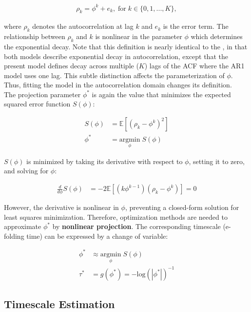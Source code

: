 \documentclass[main.tex]{subfiles}
\begin{document}
\begin{align}\label{eq:nlm}
    \rho_k = \phi^k + e_k, \; \text{for}\; k \in \{0, 1, ..., K\},
\end{align}

\noindent where $\rho_k$ denotes the autocorrelation at lag $k$ and $e_k$ is the error term. The relationship between $\rho_k$ and $k$ is nonlinear in the parameter $\phi$ which determines the exponential decay. Note that this definition is nearly identical to the , in that both models describe exponential decay in autocorrelation, except that the present model defines decay across multiple ($K$) lags of the ACF where the AR1 model uses one lag. This subtle distinction affects the parameterization of $\phi$. Thus, fitting the model in the autocorrelation domain changes its definition.\\

The projection parameter $\phi^*$ is again the value that minimizes the expected squared error function $S(\phi)$:

\begin{align}
    S(\phi) &= \mathbb{E}[(\rho_k - \phi^k)^2]\\
    \phi^* &= \underset{\phi}{\text{argmin}} \; S(\phi)
\end{align}

\noindent $S(\phi)$ is minimized by taking its derivative with respect to $\phi$, setting it to zero, and solving for $\phi$:

\begin{align}
    \frac{d}{d\phi} S(\phi) &= -2\mathbb{E}[(k\phi^{k-1})(\rho_k - \phi^k)] = 0
\end{align}

\noindent However, the derivative is nonlinear in $\phi$, preventing a closed-form solution for least squares minimization. Therefore, optimization methods are needed to approximate $\phi^*$ by \textbf{nonlinear projection}. The corresponding timescale (e-folding time) can be expressed by a change of variable:

\begin{align}
    \phi^* &\approx \underset{\phi}{\text{argmin}} \; S(\phi) \label{eq:nlm-phi}\\
    \tau^* &= g(\phi^*) = -{\text{log}(|\phi^*|)}^{-1} \label{eq:ar1-tau}
\end{align}

\subsection{Timescale Estimation}
\end{document}
